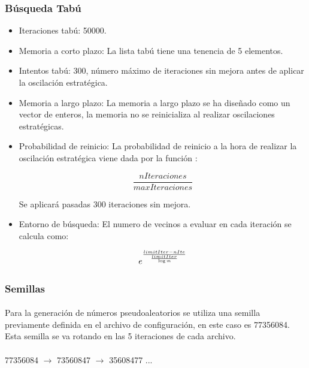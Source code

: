 \documentclass{article}
\begin{document}
	
		\subsubsection{Búsqueda Tabú}
		
			\begin{itemize}
				
				\item Iteraciones tabú: 50000.
				
				\item Memoria a corto plazo: La lista tabú tiene una tenencia de 5 elementos.
				
				\item Intentos tabú: 300, número máximo de iteraciones sin mejora antes de aplicar la oscilación estratégica.
				
				\item Memoria a largo plazo: La memoria a largo plazo se ha diseñado como un vector de enteros, la memoria no se reinicializa al realizar oscilaciones estratégicas.
				
				\item Probabilidad de reinicio: La probabilidad de reinicio a la hora de realizar la oscilación estratégica viene dada por la función :
				
				\[ \frac{nIteraciones}{maxIteraciones} \]
				
				Se aplicará pasadas 300 iteraciones sin mejora.
				
				\item Entorno de búsqueda: El numero de vecinos a evaluar en cada iteración se calcula como:
				
				\[ e^{\frac{limitIter - nIte}{ \frac{limitIter}{\log{\emph{m}}}}}\]
					
			\end{itemize}
	
	\subsubsection{Semillas}
	
	\paragraph{}Para la generación de números pseudoaleatorios se utiliza una semilla previamente definida en el archivo de configuración, en este caso es 77356084. Esta semilla se va rotando en las 5 iteraciones de cada archivo.
	
	
	\paragraph{} 77356084 $\rightarrow$ 73560847 $\rightarrow$ 35608477  ...
	
\end{document}
